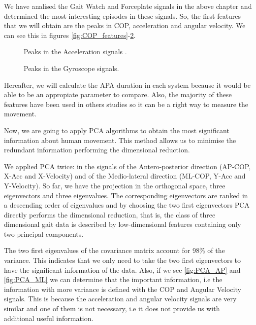 We have analised the Gait Watch and Forceplate signals in the above chapter and determined the most interesting episodes in these signals. So, the first features that we will obtain are the peaks in COP, acceleration and angular velocity. We can see this in figures \ref{fig:COP_features}-\ref{fig:Gyro_features}.
\begin{figure}[H]
	\centering
	\caption{Peaks in the Acceleration signals .}
	\label{fig:Acc_features}
\end{figure}

\begin{figure}[H]
	\centering
	\caption{Peaks in the Gyroscope signals.}
	\label{fig:Gyro_features}
\end{figure}


Hereafter, we will calculate the APA duration in each system because it would be able to be an appropiate parameter to compare. Also, the majority of these features have been used in others studies \cite{Mancini2009} so it can be a right way to measure the movement.

Now, we are going to apply PCA algorithms to obtain the most significant information about human movement. This method allows us to minimise the redundant information performing the dimensional reduction.

We applied PCA twice: in the signals of the Antero-posterior direction (AP-COP, X-Acc and X-Velocity) and of the Medio-lateral direction (ML-COP, Y-Acc and Y-Velocity). So far, we have the projection in the orthogonal space, three eigenvectors and three eigenvalues. The corresponding eigenvectors are ranked in a descending order of eigenvalues and by choosing the two first eigenvectors PCA directly performs the dimensional reduction, that is, the class of three dimensional gait data is described by low-dimensional features containing only two principal components.

The two first eigenvalues of the covariance matrix account for 98\% of the variance. This indicates that we only need to take the two first eigenvectors to have the significant information of the data. Also, if we see \ref{fig:PCA_AP} and \ref{fig:PCA_ML}  we can determine that the important information, i.e the information with more variance is defined with the COP and Angular Velocity signals. This is because the acceleration and angular velocity signals are very similar and one of them is not necessary, i.e it does not provide us with additional useful information.


